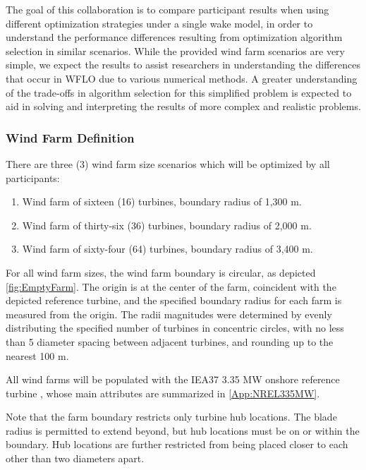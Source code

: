 \documentclass[12pt]{article}
\begin{document}
    The goal of this collaboration is to compare participant results when using different optimization strategies under a single wake model, in order to understand the performance differences resulting from optimization algorithm selection in similar scenarios. While the provided wind farm scenarios are very simple, we expect the results to assist researchers in understanding the differences that occur in WFLO due to various numerical methods. A greater understanding of the trade-offs in algorithm selection for this simplified problem is expected to aid in solving and interpreting the results of more complex and realistic problems.

\subsubsection{Wind Farm Definition}\label{Sec:OptWindFarm}
There are three (3) wind farm size scenarios which will be optimized by all participants:

        \begin{enumerate}
            \item Wind farm of sixteen (16) turbines,
                boundary radius of 1,300 m.
            \item Wind farm of thirty-six (36) turbines,
                boundary radius of 2,000 m.
            \item Wind farm of sixty-four (64) turbines,
                boundary radius of 3,400 m.
        \end{enumerate}
    
    For all wind farm sizes, the wind farm boundary is circular, as depicted \cref{fig:EmptyFarm}. The origin is at the center of the farm, coincident with the depicted reference turbine, and the specified boundary radius for each farm is measured from the origin. The radii magnitudes were determined by evenly distributing the specified number of turbines in concentric circles, with no less than 5 diameter spacing between adjacent turbines, and rounding up to the nearest 100 m.
    
    All wind farms will be populated with the IEA37 3.35 MW onshore reference turbine \cite{NREL335MW}, whose main attributes are summarized in \cref{App:NREL335MW}.
    
    Note that the farm boundary restricts only turbine hub locations. The blade radius is permitted to extend beyond, but hub locations must be on or within the boundary. Hub locations are further restricted from being placed closer to each other than two diameters apart.
    
\end{document}
